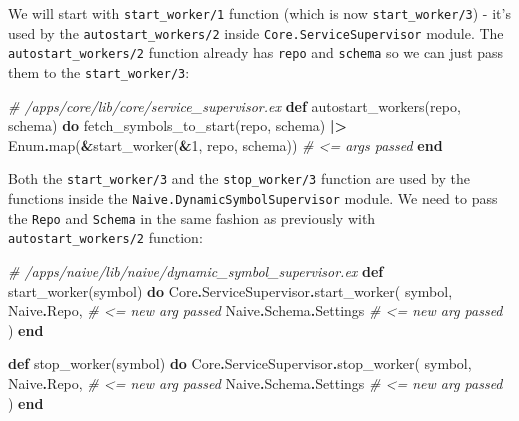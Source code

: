 \documentclass[
  oneside]{book}
\newenvironment{Shaded}{\begin{snugshade}}{\end{snugshade}}
\newcommand{\CommentTok}[1]{\textcolor[rgb]{0.56,0.35,0.01}{\textit{#1}}}
\newcommand{\ConstantTok}[1]{\textcolor[rgb]{0.00,0.00,0.00}{#1}}
\newcommand{\DecValTok}[1]{\textcolor[rgb]{0.00,0.00,0.81}{#1}}
\newcommand{\KeywordTok}[1]{\textcolor[rgb]{0.13,0.29,0.53}{\textbf{#1}}}
\newcommand{\NormalTok}[1]{#1}
\newcommand{\OperatorTok}[1]{\textcolor[rgb]{0.81,0.36,0.00}{\textbf{#1}}}
\begin{document}
We will start with \texttt{start\_worker/1} function (which is now \texttt{start\_worker/3}) - it's used by the \texttt{autostart\_workers/2} inside \texttt{Core.ServiceSupervisor} module. The \texttt{autostart\_workers/2} function already has \texttt{repo} and \texttt{schema} so we can just pass them to the \texttt{start\_worker/3}:

\begin{Shaded}
\begin{Highlighting}[]
  \CommentTok{\# /apps/core/lib/core/service\_supervisor.ex}
  \KeywordTok{def}\NormalTok{ autostart\_workers(repo, schema) }\KeywordTok{do}
\NormalTok{    fetch\_symbols\_to\_start(repo, schema)}
    \OperatorTok{|\textgreater{}} \ConstantTok{Enum}\OperatorTok{.}\NormalTok{map(}\OperatorTok{\&}\NormalTok{start\_worker(}\OperatorTok{\&}\DecValTok{1}\NormalTok{, repo, schema)) }\CommentTok{\# \textless{}= args passed}
  \KeywordTok{end}
\end{Highlighting}
\end{Shaded}

Both the \texttt{start\_worker/3} and the \texttt{stop\_worker/3} function are used by the functions inside the \texttt{Naive.DynamicSymbolSupervisor} module. We need to pass the \texttt{Repo} and \texttt{Schema} in the same fashion as previously with \texttt{autostart\_workers/2} function:

\begin{Shaded}
\begin{Highlighting}[]
  \CommentTok{\# /apps/naive/lib/naive/dynamic\_symbol\_supervisor.ex}
  \KeywordTok{def}\NormalTok{ start\_worker(symbol) }\KeywordTok{do}
    \ConstantTok{Core}\OperatorTok{.}\ConstantTok{ServiceSupervisor}\OperatorTok{.}\NormalTok{start\_worker(}
\NormalTok{      symbol,}
      \ConstantTok{Naive}\OperatorTok{.}\ConstantTok{Repo}\NormalTok{,            }\CommentTok{\# \textless{}= new arg passed}
      \ConstantTok{Naive}\OperatorTok{.}\ConstantTok{Schema}\OperatorTok{.}\ConstantTok{Settings}  \CommentTok{\# \textless{}= new arg passed}
\NormalTok{    )}
  \KeywordTok{end}

  \KeywordTok{def}\NormalTok{ stop\_worker(symbol) }\KeywordTok{do}
    \ConstantTok{Core}\OperatorTok{.}\ConstantTok{ServiceSupervisor}\OperatorTok{.}\NormalTok{stop\_worker(}
\NormalTok{      symbol,}
      \ConstantTok{Naive}\OperatorTok{.}\ConstantTok{Repo}\NormalTok{,           }\CommentTok{\# \textless{}= new arg passed}
      \ConstantTok{Naive}\OperatorTok{.}\ConstantTok{Schema}\OperatorTok{.}\ConstantTok{Settings} \CommentTok{\# \textless{}= new arg passed}
\NormalTok{    )}
  \KeywordTok{end}
\end{Highlighting}
\end{Shaded}
\end{document}
